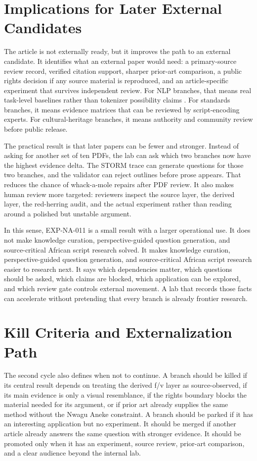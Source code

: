 \documentclass[sigconf,nonacm]{acmart}
\begin{document}
\section{Implications for Later External Candidates}
The article is not externally ready, but it improves the path to an external
candidate. It identifies what an external paper would need: a primary-source
review record, verified citation support, sharper prior-art comparison, a public
rights decision if any source material is reproduced, and an article-specific
experiment that survives independent review. For NLP branches, that means real
task-level baselines rather than tokenizer possibility claims \cite{wadden2020scifact,gao2023alce,sennrich2016bpe,kudo2018sentencepiece,bostrom2020bytepair,rust2021tokenization}.
For standards branches, it means evidence matrices that can be reviewed by
script-encoding experts. For cultural-heritage branches, it means authority and
community review before public release.

The practical result is that later papers can be fewer and stronger. Instead of
asking for another set of ten PDFs, the lab can ask which two branches now have
the highest evidence delta. The STORM trace can generate questions for those two
branches, and the validator can reject outlines before prose appears. That
reduces the chance of whack-a-mole repairs after PDF review. It also makes
human review more targeted: reviewers inspect the source layer, the derived
layer, the red-herring audit, and the actual experiment rather than reading
around a polished but unstable argument.

In this sense, EXP-NA-011 is a small result with a larger operational use. It
does not make knowledge curation, perspective-guided question generation, and source-critical African script research solved. It makes knowledge curation, perspective-guided question generation, and source-critical African script research easier to research next. It says
which dependencies matter, which questions should be asked, which claims are
blocked, which application can be explored, and which review gate controls
external movement. A lab that records those facts can accelerate without
pretending that every branch is already frontier research.

\section{Kill Criteria and Externalization Path}
The second cycle also defines when not to continue. A branch should be killed if
its central result depends on treating the derived f/v layer as source-observed,
if its main evidence is only a visual resemblance, if the rights boundary blocks
the material needed for its argument, or if prior art already supplies the same
method without the Nwagu Aneke constraint. A branch should be parked if it has
an interesting application but no experiment. It should be merged if another
article already answers the same question with stronger evidence. It should be
promoted only when it has an experiment, source review, prior-art comparison,
and a clear audience beyond the internal lab.
\end{document}
